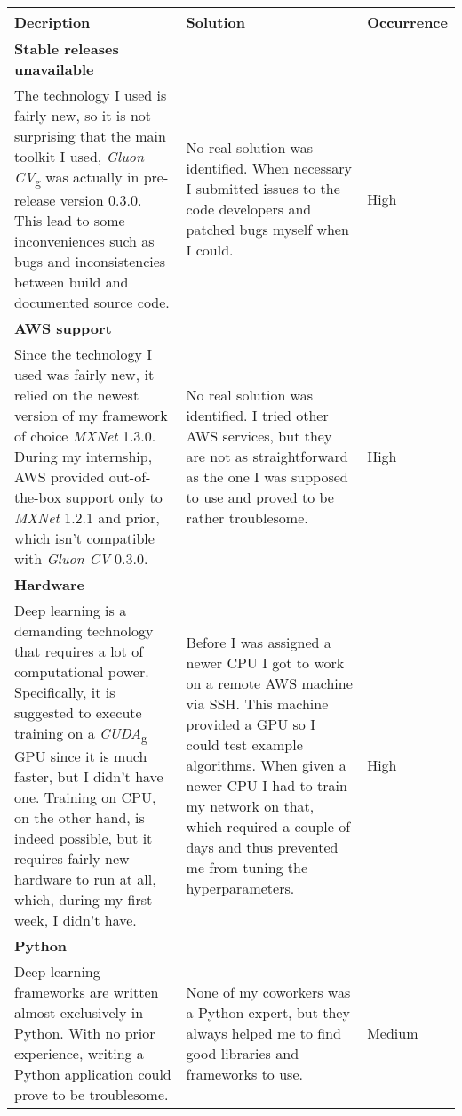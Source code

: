 \begin{center}
    \begin{tabular}{ | p{5cm} | p{5cm} | p{2cm} |}
    \hline
    \textbf{Decription} & \textbf{Solution} & \textbf{Occurrence} \\ \hline
    \textbf{Stable releases unavailable} \\ The technology I used is fairly new, so it is not surprising that the main toolkit I used, \emph{\gls{Gluon CV}}\textsubscript{g} was actually in pre-release version 0.3.0. This lead to some inconveniences such as bugs and inconsistencies between build and documented source code. & No real solution was identified. When necessary I submitted issues to the code developers and patched bugs myself when I could. & High \\ \hline
    \textbf{AWS support}\\ Since the technology I used was fairly new, it relied on the newest version of my framework of choice \emph{MXNet} 1.3.0. During my internship, AWS provided out-of-the-box support only to \emph{MXNet} 1.2.1 and prior, which isn't compatible with \emph{Gluon CV} 0.3.0. & No real solution was identified. I tried other AWS services, but they are not as straightforward as the one I was supposed to use and proved to be rather troublesome. & High \\ \hline
    \textbf{Hardware} \\ Deep learning is a demanding technology that requires a lot of computational power. Specifically, it is suggested to execute training on a \emph{\gls{CUDA}}\textsubscript{g} GPU since it is much faster, but I didn't have one. Training on CPU, on the other hand, is indeed possible, but it requires fairly new hardware to run at all, which, during my first week, I didn't have. & Before I was assigned a newer CPU I got to work on a remote AWS machine via SSH. This machine provided a GPU so I could test example algorithms. When given a newer CPU I had to train my network on that, which required a couple of days and thus prevented me from tuning the hyperparameters. & High \\ \hline
   \textbf{Python} \\ Deep learning frameworks are written almost exclusively in Python. With no prior experience, writing a Python application could prove to be troublesome. & None of my coworkers was a Python expert, but they always helped me to find good libraries and frameworks to use. & Medium \\ \hline
   \end{tabular}
\end{center}


